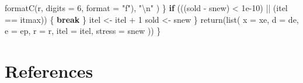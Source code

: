 \documentclass[
  12pt,
  letterpaper,
  DIV=11,
  numbers=noendperiod]{scrartcl}
\newenvironment{Shaded}{\begin{snugshade}}{\end{snugshade}}
\newcommand{\AttributeTok}[1]{\textcolor[rgb]{0.40,0.45,0.13}{#1}}
\newcommand{\ControlFlowTok}[1]{\textcolor[rgb]{0.00,0.23,0.31}{\textbf{#1}}}
\newcommand{\DecValTok}[1]{\textcolor[rgb]{0.68,0.00,0.00}{#1}}
\newcommand{\FloatTok}[1]{\textcolor[rgb]{0.68,0.00,0.00}{#1}}
\newcommand{\FunctionTok}[1]{\textcolor[rgb]{0.28,0.35,0.67}{#1}}
\newcommand{\NormalTok}[1]{\textcolor[rgb]{0.00,0.23,0.31}{#1}}
\newcommand{\OtherTok}[1]{\textcolor[rgb]{0.00,0.23,0.31}{#1}}
\newcommand{\SpecialCharTok}[1]{\textcolor[rgb]{0.37,0.37,0.37}{#1}}
\newcommand{\StringTok}[1]{\textcolor[rgb]{0.13,0.47,0.30}{#1}}
\newcommand{\sectionbreak}{\clearpage}
\begin{document}
\begin{Shaded}
\begin{Highlighting}[]
          \FunctionTok{formatC}\NormalTok{(r, }\AttributeTok{digits =} \DecValTok{6}\NormalTok{, }\AttributeTok{format =} \StringTok{"f"}\NormalTok{),}
          \StringTok{"}\SpecialCharTok{\textbackslash{}n}\StringTok{"}
\NormalTok{        )}
\NormalTok{      \}}
      \ControlFlowTok{if}\NormalTok{ (((sold }\SpecialCharTok{{-}}\NormalTok{ snew) }\SpecialCharTok{\textless{}} \FloatTok{1e{-}10}\NormalTok{) }\SpecialCharTok{||}\NormalTok{ (itel }\SpecialCharTok{==}\NormalTok{ itmax)) \{}
        \ControlFlowTok{break}
\NormalTok{      \}}
\NormalTok{      itel }\OtherTok{\textless{}{-}}\NormalTok{ itel }\SpecialCharTok{+} \DecValTok{1}
\NormalTok{      sold }\OtherTok{\textless{}{-}}\NormalTok{ snew}
\NormalTok{    \}}
    \FunctionTok{return}\NormalTok{(}\FunctionTok{list}\NormalTok{(}
      \AttributeTok{x =}\NormalTok{ xe,}
      \AttributeTok{d =}\NormalTok{ de,}
      \AttributeTok{e =}\NormalTok{ ep,}
      \AttributeTok{r =}\NormalTok{ r,}
      \AttributeTok{itel =}\NormalTok{ itel,}
      \AttributeTok{stress =}\NormalTok{ snew}
\NormalTok{    ))}
\NormalTok{  \}}
\end{Highlighting}
\end{Shaded}

\sectionbreak

\section*{References}\label{references}
\end{document}
